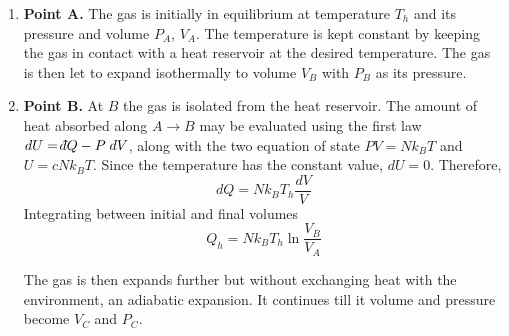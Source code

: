 \documentclass[../../../Main.tex]{subfiles}
\begin{document}
\begin{enumerate}
    \item \textbf{Point A.} The gas is initially in equilibrium at temperature $T_h$ and its pressure and volume $P_A $, $V_A$. The temperature is kept constant by keeping the gas in contact with a heat reservoir at the desired temperature. The gas is then let to expand isothermally to volume $V_B$ with $P_B$ as its pressure.

    \item \textbf{Point B.} At $B$ the gas is isolated from the heat reservoir. The amount of heat absorbed along $A\rightarrow B$ may be evaluated using the first law $dU=\dbar Q-P\;dV$, along with the two equation of state $PV=Nk_BT$ and $U=cNk_BT$. Since the temperature has the constant value, $dU=0$. Therefore,
    \begin{equation*}
        dQ=Nk_BT_h  \frac{dV}{V}
    \end{equation*}
    Integrating between initial and final volumes
    \begin{equation*}
        Q_h=Nk_BT_h \ln \frac{V_B}{V_A}
    \end{equation*}

    The gas is then expands further but without exchanging heat with the environment, an adiabatic expansion. It continues till it volume and pressure become $V_C$ and $P_C$.


\end{enumerate}
\end{document}
